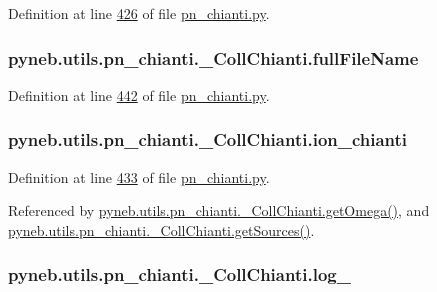 Definition at line \hyperlink{pn__chianti_8py_source_l00426}{426} of file \hyperlink{pn__chianti_8py_source}{pn\-\_\-chianti.\-py}.

\hypertarget{classpyneb_1_1utils_1_1pn__chianti_1_1___coll_chianti_abe0d4b4734d0426b2053329f466793c4}{
\subsubsection[{full\-File\-Name}]{\setlength{\rightskip}{0pt plus 5cm}pyneb.\-utils.\-pn\-\_\-chianti.\-\_\-\-Coll\-Chianti.\-full\-File\-Name}}\label{classpyneb_1_1utils_1_1pn__chianti_1_1___coll_chianti_abe0d4b4734d0426b2053329f466793c4}


Definition at line \hyperlink{pn__chianti_8py_source_l00442}{442} of file \hyperlink{pn__chianti_8py_source}{pn\-\_\-chianti.\-py}.

\hypertarget{classpyneb_1_1utils_1_1pn__chianti_1_1___coll_chianti_af0f28fb84d1ceb9d64e40429c981a6f6}{
\subsubsection[{ion\-\_\-chianti}]{\setlength{\rightskip}{0pt plus 5cm}pyneb.\-utils.\-pn\-\_\-chianti.\-\_\-\-Coll\-Chianti.\-ion\-\_\-chianti}}\label{classpyneb_1_1utils_1_1pn__chianti_1_1___coll_chianti_af0f28fb84d1ceb9d64e40429c981a6f6}


Definition at line \hyperlink{pn__chianti_8py_source_l00433}{433} of file \hyperlink{pn__chianti_8py_source}{pn\-\_\-chianti.\-py}.



Referenced by \hyperlink{pn__chianti_8py_source_l00507}{pyneb.\-utils.\-pn\-\_\-chianti.\-\_\-\-Coll\-Chianti.\-get\-Omega()}, and \hyperlink{pn__chianti_8py_source_l00570}{pyneb.\-utils.\-pn\-\_\-chianti.\-\_\-\-Coll\-Chianti.\-get\-Sources()}.

\hypertarget{classpyneb_1_1utils_1_1pn__chianti_1_1___coll_chianti_a1bb28a8bbcbca5499d0588860cd4280f}{
\subsubsection[{log\-\_\-}]{\setlength{\rightskip}{0pt plus 5cm}pyneb.\-utils.\-pn\-\_\-chianti.\-\_\-\-Coll\-Chianti.\-log\-\_\-}}\label{classpyneb_1_1utils_1_1pn__chianti_1_1___coll_chianti_a1bb28a8bbcbca5499d0588860cd4280f}


